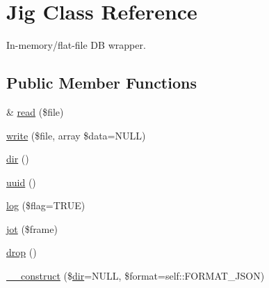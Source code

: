 \hypertarget{class_d_b_1_1_jig}{}\section{Jig Class Reference}
\label{class_d_b_1_1_jig}


In-\/memory/flat-\/file DB wrapper.  


\subsection*{Public Member Functions}
\begin{DoxyCompactItemize}
\item 
\& \hyperlink{class_d_b_1_1_jig_a49e4883f63642e3c6593545d87feae4a}{read} (\$file)
\item 
\hyperlink{class_d_b_1_1_jig_ab5b85afee638474da9c66ecd35d9bee1}{write} (\$file, array \$data=N\+U\+LL)
\item 
\hyperlink{class_d_b_1_1_jig_a17cfff4e7aae63d66e06be93dcf3ea31}{dir} ()
\item 
\hyperlink{class_d_b_1_1_jig_a0a684acda95e124d8596758e4986fe44}{uuid} ()
\item 
\hyperlink{class_d_b_1_1_jig_a92faa80a7077936bd630e5dcc7bb4a64}{log} (\$flag=T\+R\+UE)
\item 
\hyperlink{class_d_b_1_1_jig_ab165454e8fcb681f401a76fc77eab8e6}{jot} (\$frame)
\item 
\hyperlink{class_d_b_1_1_jig_aeb639e5b2b713ed87ab8f2033af98ae8}{drop} ()
\item 
\hyperlink{class_d_b_1_1_jig_a2a82bc563fc5e6152b0d0eb2c687b10a}{\+\_\+\+\_\+construct} (\$\hyperlink{class_d_b_1_1_jig_a17cfff4e7aae63d66e06be93dcf3ea31}{dir}=N\+U\+LL, \$format=self\+::\+F\+O\+R\+M\+A\+T\+\_\+\+J\+S\+ON)
\end{DoxyCompactItemize}
